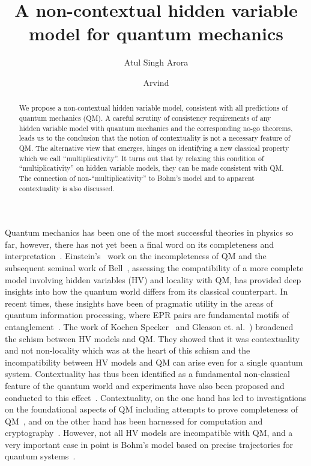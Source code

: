 \documentclass[british,aps,prl,superscriptaddress,nofootinbib,times,reprint]{revtex4-1}
\theoremstyle{plain}
\theoremstyle{plain}
\theoremstyle{definition}
\theoremstyle{remark}
\theoremstyle{remark}
\theoremstyle{remark}
\theoremstyle{plain}
\theoremstyle{plain}
\theoremstyle{plain}
\theoremstyle{definition}
\theoremstyle{definition}
\begin{document}
\title{A non-contextual hidden variable model for quantum mechanics}
\author{Atul Singh Arora}
%
\author{Arvind}
%
\begin{abstract}
We propose a non-contextual hidden variable model,
consistent with all predictions of quantum
mechanics (QM).  A careful scrutiny of consistency
requirements of any hidden variable model with
quantum mechanics and the corresponding no-go
theorems, leads us to the conclusion that the
notion of contextuality is not a necessary feature
of QM.  The alternative view that emerges, hinges
on identifying a new classical property which we
call ``multiplicativity''.  It turns out that by
relaxing this condition of ``multiplicativity'' on
hidden variable models, they can be made
consistent with QM.  The connection of
non-``multiplicativity'' to Bohm's model and to
apparent contextuality is also discussed.
\end{abstract}
\pacs{}
\maketitle
Quantum mechanics has been one of the most
successful theories in physics so far, however,
there has not yet been a final word on its
completeness and interpretation~\cite{BellSpkblUnspkbl}.
Einstein's~\cite{EinsteinEPR} work on the
incompleteness of QM and the subsequent seminal
work of Bell~\cite{BellSpkblUnspkbl}, assessing the
compatibility of a more complete model involving
hidden variables (HV) and locality with QM, has
provided deep insights into  how the quantum world
differs from its classical counterpart.  In recent
times, these insights have been of pragmatic
utility in the areas of quantum information
processing, where EPR pairs are fundamental motifs
of entanglement~\cite{Ekert,PironioRndmnssCrtfcn,NielsenChuang}.
The work of  Kochen Specker~\cite{KochenSpecker}
and Gleason et.
al.~\cite{Gleason,BellOnHiddenVariables,Peres,Mermin})
broadened the schism between  HV models and QM.
They showed that it was contextuality and not
non-locality which was at the heart of this schism
and the incompatibility between HV models and QM
can arise even for a single quantum system.
Contextuality has thus been identified as a
fundamental non-classical feature of the quantum
world and experiments have also been proposed and
conducted to this effect~\cite{SimonContExpProp,
HuangContExp}.
Contextuality, on the one hand has led to
investigations on the foundational aspects of
QM including attempts to prove completeness of QM~\cite{PawelCntxClsscl,CabelloMmryQM}, and on the other
hand has been harnessed for computation and
cryptography~\cite{HowardCntxCmptn,CabelloCntxScrt}.
However, not all HV
models are incompatible with QM, and a very
important case in point is  Bohm's model based on
precise trajectories for quantum
systems~\cite{Bohm1,Bohm2}. 
\end{document}

